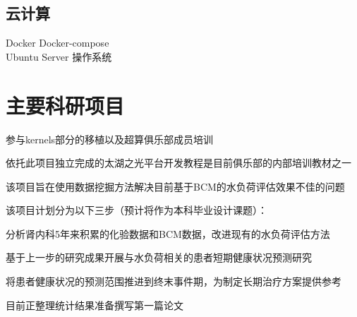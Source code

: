 \documentclass[]{deedy-resume-openfont}
\begin{document}
\begin{minipage}[t]{0.25\textwidth}
	\subsection{云计算}
	Docker \textbullet{} Docker-compose \\
	Ubuntu Server 操作系统 \\
	\sectionsep


\end{minipage}
\hfill
\begin{minipage}[t]{0.73\textwidth}


	\section{主要科研项目}
	\descript{}
	\vspace{\topsep}
	\begin{tightemize}
		\item 参与kernels部分的移植以及超算俱乐部成员培训
		\item 依托此项目独立完成的太湖之光平台开发教程是目前俱乐部的内部培训教材之一
	\end{tightemize}
    \sectionsep

	\descript{}
    \begin{tightemize}
        \item 该项目旨在使用数据挖掘方法解决目前基于BCM的水负荷评估效果不佳的问题
        \item 该项目计划分为以下三步（预计将作为本科毕业设计课题）：
        \vspace{\topsep}
        \begin{tightemize}
            \item 分析肾内科5年来积累的化验数据和BCM数据，改进现有的水负荷评估方法
            \item 基于上一步的研究成果开展与水负荷相关的患者短期健康状况预测研究
            \item 将患者健康状况的预测范围推进到终末事件期，为制定长期治疗方案提供参考
        \end{tightemize}
        \vspace{\topsep}
		\item 目前正整理统计结果准备撰写第一篇论文
	\end{tightemize}
    \sectionsep


\end{minipage}
\end{document}

